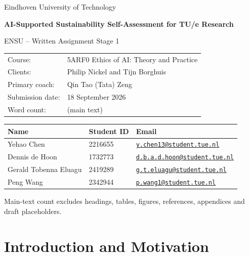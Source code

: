 \documentclass[11pt,a4paper]{article}
\begin{document}
\hypersetup{pageanchor=false}
\begin{titlepage}
\centering
\vspace*{3cm}
{\Large Eindhoven University of Technology\par}
\vspace{1.5cm}
{\huge\bfseries AI-Supported Sustainability Self-Assessment for TU/e Research\par}
\vspace{0.6cm}
{\Large ENSU -- Written Assignment Stage 1\par}
\vfill
\begin{tabularx}{0.95\textwidth}{@{}lX@{}}
Course: & 5ARF0 Ethics of AI: Theory and Practice \\
Clients: & Philip Nickel and Tijn Borghuis \\
Primary coach: & Qin Tao (Tata) Zeng \\
Submission date: & 18 September 2026 \\
Word count: & \mainwordcount{} (main text)
\end{tabularx}

\vspace{1cm}
\begin{tabularx}{0.95\textwidth}{@{}p{}p{}X@{}}
\toprule
Name & Student ID & Email \\
\midrule
Yehao Chen & 2216655 & \href{mailto:y.chen13@student.tue.nl}{\nolinkurl{y.chen13@student.tue.nl}} \\
Dennis de Hoon & 1732773 & \href{mailto:d.b.a.d.hoon@student.tue.nl}{\nolinkurl{d.b.a.d.hoon@student.tue.nl}} \\
Gerald Tobenna Eluagu & 2419289 & \href{mailto:g.t.eluagu@student.tue.nl}{\nolinkurl{g.t.eluagu@student.tue.nl}} \\
Peng Wang & 2342944 & \href{mailto:p.wang1@student.tue.nl}{\nolinkurl{p.wang1@student.tue.nl}} \\
\bottomrule
\end{tabularx}

\vspace{0.6cm}
{\footnotesize Main-text count excludes headings, tables, figures, references, appendices and draft placeholders.\par}

\vfill
\end{titlepage}
\hypersetup{pageanchor=true}

\section{Introduction and Motivation}
\end{document}
